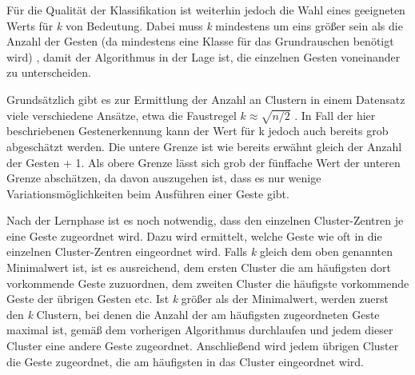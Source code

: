 Für die Qualität der Klassifikation ist weiterhin jedoch die Wahl eines geeigneten Werts für \emph{k} von Bedeutung. Dabei muss \emph{k} mindestens um eins größer sein als die Anzahl der Gesten (da mindestens eine Klasse für das Grundrauschen benötigt wird)
, damit der Algorithmus in der Lage ist, die einzelnen Gesten voneinander zu unterscheiden.  


Grundsätzlich gibt es zur Ermittlung der Anzahl an Clustern in einem Datensatz viele verschiedene Ansätze, etwa die Faustregel $k \approx \sqrt{n/2}$ \cite{WikipediaKMeansKValue}. In Fall der hier beschriebenen Gestenerkennung kann der Wert für k jedoch auch bereits grob abgeschätzt werden. Die untere Grenze ist wie bereits erwähnt gleich der Anzahl der Gesten + 1. Als obere Grenze lässt sich grob der fünffache Wert der unteren Grenze abschätzen, da davon auszugehen ist, dass es nur wenige Variationsmöglichkeiten beim Ausführen einer Geste gibt.

Nach der Lernphase ist es noch notwendig, dass den einzelnen Cluster-Zentren je eine Geste zugeordnet wird. Dazu wird ermittelt, welche Geste wie oft in die einzelnen Cluster-Zentren eingeordnet wird. Falls \emph{k} gleich dem oben genannten Minimalwert ist, ist es ausreichend, dem ersten Cluster die am häufigsten dort vorkommende Geste zuzuordnen, dem zweiten Cluster die häufigste vorkommende Geste der übrigen Gesten etc. 
Ist \emph{k} größer als der Minimalwert, werden zuerst den \emph{k} Clustern, bei denen die Anzahl der am häufigsten zugeordneten Geste maximal ist, gemäß dem vorherigen Algorithmus durchlaufen und jedem dieser Cluster eine andere Geste zugeordnet. Anschließend wird jedem übrigen Cluster die Geste zugeordnet, die am häufigsten in das Cluster eingeordnet wird.

